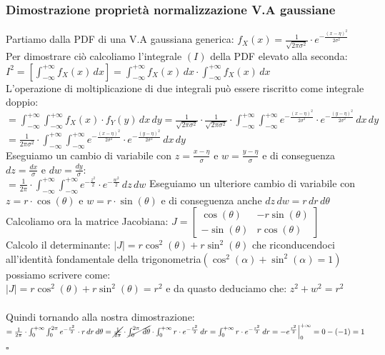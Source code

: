 \documentclass{article}
\begin{document}
\subsubsection{Dimostrazione proprietà normalizzazione V.A gaussiane}
Partiamo dalla PDF di una V.A gaussiana generica: $f_X(x) = \frac{1}{\sqrt{2 \pi \sigma^2}} \cdot e^{-\frac{\left( x - \eta \right)^2}{2\sigma^2}} $ \\
Per dimostrare ciò calcoliamo l’integrale $\left(I\right)$ della PDF elevato alla seconda: \\
$I^2 = \left[\int_{-\infty}^{+\infty} f_X(x) \,dx \right] = \int_{-\infty}^{+\infty} f_X(x) \,dx \cdot \int_{-\infty}^{+\infty} f_X(x) \,dx$ \\
L’operazione di moltiplicazione di due integrali può essere riscritto come integrale doppio: \\
$= \int_{-\infty}^{+\infty} \int_{-\infty}^{+\infty} f_X(x) \cdot f_Y(y) \,dx\,dy = \frac{1}{\sqrt{2 \pi \sigma^2}} \cdot \frac{1}{\sqrt{2 \pi \sigma^2}} \cdot \int_{-\infty}^{+\infty}\int_{-\infty}^{+\infty} e^{-\frac{\left( x - \eta \right)^2}{2\sigma^2}} \cdot e^{-\frac{\left( y - \eta \right)^2}{2\sigma^2}} \,dx\,dy$ \\
$= \frac{1}{2 \pi \sigma^2} \cdot \int_{-\infty}^{+\infty}\int_{-\infty}^{+\infty} e^{-\frac{\left( x - \eta \right)^2}{2\sigma^2}} \cdot e^{-\frac{\left( y - \eta \right)^2}{2\sigma^2}} \,dx\,dy$ \\
Eseguiamo un cambio di variabile con $z = \frac{x-\eta}{\sigma}$ e $w = \frac{y - \eta}{\sigma}$ e di conseguenza $dz = \frac{dx}{\sigma}$ e $dw = \frac{dy}{\sigma}$: \\
$= \frac{1}{2 \pi} \cdot \int_{-\infty}^{+\infty} \int_{-\infty}^{+\infty} e^{-\frac{z^2}{2}} \cdot e^{-\frac{w^2}{2}} \,dz \,dw$
Eseguiamo un ulteriore cambio di variabile con $z = r \cdot \cos (\theta)$ e $w = r \cdot \sin (\theta)$ e di conseguenza anche $dz \, dw = r \,dr \, d\theta$ \\
Calcoliamo ora la matrice Jacobiana: $J = \begin{bmatrix}
\cos (\theta) & -r\sin (\theta) \\
-\sin (\theta) & r\cos (\theta)
\end{bmatrix}$ \\
Calcolo il determinante: $|J| = r\cos^2(\theta) + r\sin^2(\theta)$ che riconducendoci all’identità fondamentale della trigonometria$\left(\cos^2(\alpha) + \sin^2(\alpha) = 1\right)$ possiamo scrivere come: \\
$|J| = r\cos^2(\theta) + r\sin^2(\theta) = r^2$ e da quasto deduciamo che: $z^2 + w^2 = r^2$ \\ \\
Quindi tornando alla nostra dimostrazione: \\
$= \frac{1}{2 \pi} \cdot \int_{0}^{+\infty} \int_{0}^{2\pi} e^{-\frac{r^2}{2}} \cdot r\,dr \,d\theta = \cancel{\frac{1}{2 \pi}} \cdot \cancel{\int_{0}^{2 \pi} \,d\theta} \cdot \int_{0}^{+\infty} r \cdot e^{-\frac{r^2}{2}} \,dr = \int_{0}^{+\infty} r \cdot e^{-\frac{r^2}{2}} \,dr = - e^{\frac{r^2}{2}} \Big|_{0}^{+\infty} = 0 -(-1) = 1$ \\
\hspace*{0pt}\hfill $\square$
\end{document}
